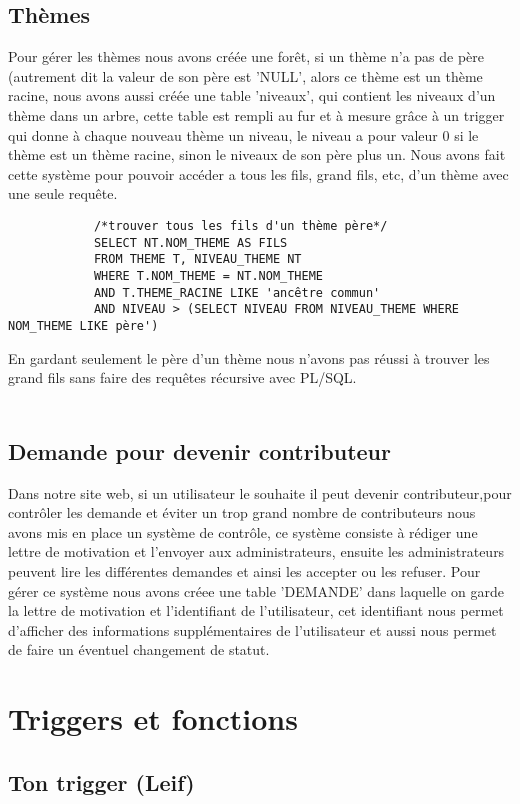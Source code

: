 \documentclass[french]{article}
\begin{document}
        \subsection{Thèmes}
        Pour gérer les thèmes nous avons créée une forêt, si un thème n'a pas de père (autrement dit la valeur de son père est 'NULL', alors ce thème est un thème racine, nous avons aussi créée une table 'niveaux', qui contient les niveaux d'un thème dans un arbre, cette table est rempli au fur et à mesure grâce à un trigger qui donne à chaque nouveau thème un niveau, le niveau a pour valeur 0 si le thème est un thème racine, sinon le niveaux de son père plus un. Nous avons fait cette système pour pouvoir accéder a tous les fils, grand fils, etc, d'un thème avec une seule requête. 
        \begin{verbatim}
            /*trouver tous les fils d'un thème père*/
            SELECT NT.NOM_THEME AS FILS
            FROM THEME T, NIVEAU_THEME NT
            WHERE T.NOM_THEME = NT.NOM_THEME
            AND T.THEME_RACINE LIKE 'ancêtre commun'
            AND NIVEAU > (SELECT NIVEAU FROM NIVEAU_THEME WHERE NOM_THEME LIKE père')
        \end{verbatim}
        En gardant seulement le père d'un thème nous n'avons pas réussi à trouver les grand fils sans faire des requêtes récursive avec PL/SQL. \\\\
    \subsection{Demande pour devenir contributeur}
        Dans notre site web, si un utilisateur le souhaite il peut devenir contributeur,pour contrôler les demande et éviter un trop grand nombre de contributeurs nous avons mis en place un système de contrôle, ce système consiste à rédiger une lettre de motivation et l'envoyer aux administrateurs, ensuite les administrateurs peuvent lire les différentes demandes et ainsi les accepter ou les refuser. Pour gérer ce système nous avons créee une table 'DEMANDE' dans laquelle on garde la lettre de motivation et l'identifiant de l'utilisateur, cet identifiant nous permet d'afficher des informations supplémentaires de l'utilisateur et aussi nous permet de faire un éventuel changement de statut.
        \newpage
        \section{Triggers et fonctions}
        \subsection{Ton trigger (Leif)}
\end{document}
